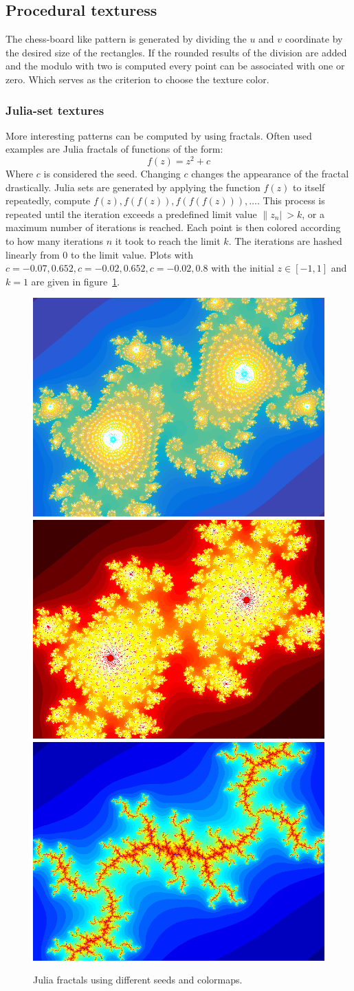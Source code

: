 \subsection{Procedural texturess}
The chess-board like pattern is generated by dividing the $u$ and $v$ coordinate by the desired size of the rectangles. If the rounded results of the division are added and the modulo with two is computed every point can be associated with one or zero. Which serves as the criterion to choose the texture color. 
\subsubsection{Julia-set textures}
More interesting patterns can be computed by using fractals. Often used examples are Julia fractals of functions of the form:
\begin{equation}
f(z) = z^2 + c
\end{equation}
Where $c$ is considered the seed. Changing $c$ changes the appearance of the fractal drastically. Julia sets are generated by applying the function $f(z)$ to itself repeatedly, compute $f(z),f(f(z)),f(f(f(z))),\dots$. This process is repeated until the iteration exceeds a predefined limit value $\|z_n|\ > k$, or a maximum number of iterations is reached. Each point is then colored according to how many iterations $n$ it took to reach the limit $k$. The iterations are hashed linearly from 0 to the limit value. Plots with $c = -0.07,0.652, c = -0.02,0.652, c= -0.02,0.8$ with the initial $z \in [-1,1]$ and $k = 1$ are given in figure~\ref{fig:julia4}.
\begin{figure}
\centering
\includegraphics[width=0.25\linewidth]{./img/julia1New}
\includegraphics[width=0.25\linewidth]{./img/julia2}
\includegraphics[width=0.25\linewidth]{./img/julia4}
\caption{Julia fractals using different seeds and colormaps.}
\label{fig:julia4}
\end{figure}
